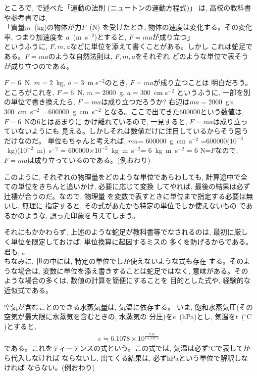 ところで, で述べた「運動の法則 (ニュートンの運動方程式)」
は, 高校の教科書や参考書では, \\
「質量$m$~(kg)の物体が力$F$~(N)
を受けたとき, 物体の速度は変化する。その変化率, つまり加速度を
$a$~(m~s$^{-2}$)とすると, $F=ma$が成り立つ」\\
というふうに, $F, m, a$などに単位を添えて書くことがある。しかし
これは蛇足である。$F=ma$のような自然法則は, $F, m, a$をそれぞれ
どのような単位で表そうが成り立つのである。

\begin{exmpl}
$F=6$~N, $m=2$~kg, $a=$3~m s$^{-2}$のとき, $F=ma$が成り立つことは
明白だろう。ところがこれを, $F=6$~N, $m=2000$~g, $a=$300~cm s$^{-2}$
というふうに, 一部を別の単位で書き換えたら, $F=ma$は成り立つだろうか? 
右辺は$ma=2000$~g$\times$300~cm~s$^{-2}$~=600000~g~cm~s$^{-2}$
となる。ここで出てきた600000という数値は, $F=6$~Nの6とはあまりに
かけ離れているので, 一見すると, $F=ma$は成り立っていないようにも
見える。しかしそれは数値だけに注目しているからそう思うだけなのだ。
単位もちゃんと考えれば, $ma$= 600000~g~cm~s$^{-2}$ =600000($10^{-3}$~kg)($10^{-2}$~m)~s$^{-2}$
= 600000$\times10^{-5}$~kg~m~s$^{-2}$= 6~kg~m~s$^{-2}$ = 6 N=$F$なので, 
$F=ma$は成り立っているのである。(例おわり)\end{exmpl}

このように, それぞれの物理量をどのような単位であらわしても, 
計算途中で全ての単位をきちんと追いかけ, 必要に応じて変換
してやれば, 最後の結果は必ず辻褄が合うのだ。なので, 物理量
を変数で表すときに単位まで指定する必要は無いし, 無理に
指定すると, その式があたかも特定の単位でしか使えないもの
であるかのような, 誤った印象を与えてしまう。

それにもかかわらず, 上述のような蛇足が教科書等でなされるのは, 
最初に厳しく単位を限定しておけば, 単位換算に起因するミスの
多くを防げるからである。君も, 。\\

ちなみに, 世の中には, 特定の単位でしか使えないような式も存在
する。そのような場合は, 変数に単位を添え書きすることは蛇足ではなく, 
意味がある。そのような場合の多くは, 数値の計算を簡便にすることを
目的とした式や, 経験的な近似式である。\\

\begin{exmpl} 空気が含むことのできる水蒸気量は, 気温に依存する。
いま, 飽和水蒸気圧(その空気が最大限に水蒸気を含むときの, 水蒸気の
分圧)を$e$~(hPa)とし, 気温を$t$~(${}^\circ\mathrm{C}$)とすると, 
\begin{eqnarray}
e \fallingdotseq 6.1078\times10^{\frac{7.5 t}{t+237.3}}
\end{eqnarray}
である。これをティーテンスの式という。この式では, 
気温は必ず${}^\circ\mathrm{C}$で表してから代入しなければ
ならないし, 出てくる結果は, 必ずhPaという単位で解釈しなければ
ならない。(例おわり)\end{exmpl}


